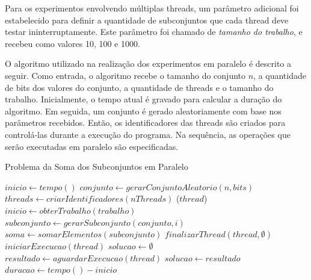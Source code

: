 \documentclass[12pt]{article}
\begin{document}
Para os experimentos envolvendo múltiplas threads, um parâmetro adicional foi estabelecido para definir a quantidade de subconjuntos que cada thread deve testar ininterruptamente. Este parâmetro foi chamado de \textit{tamanho do trabalho}, e recebeu como valores 10, 100 e 1000.

O algoritmo utilizado na realização dos experimentos em paralelo é descrito a seguir. Como entrada, o algoritmo recebe o tamanho do conjunto $n$, a quantidade de bits dos valores do conjunto, a quantidade de threads e o tamanho do trabalho. Inicialmente, o tempo atual é gravado para calcular a duração do algoritmo. Em seguida, um conjunto é gerado aleatoriamente com base nos parâmetros recebidos. Então, os identificadores das threads são criados para controlá-las durante a execução do programa. Na sequência, as operações que serão executadas em paralelo são especificadas.

\begin{algorithm}[ht]
  \small
  \DontPrintSemicolon
  \caption{Problema da Soma dos Subconjuntos em Paralelo}
  \label{alg:exp}

  \BlankLine
  $inicio \leftarrow tempo()$ \;
  $conjunto \leftarrow gerarConjuntoAleatorio(n, bits)$ \;
  $threads \leftarrow criarIdentificadores(nThreads)$ \;
  \BlankLine
   {
    \Parallel($thread$){
         {
            $inicio \leftarrow obterTrabalho(trabalho)$ \;
             {
                $subconjunto \leftarrow gerarSubconjunto(conjunto, i)$ \;
                $soma \leftarrow somarElementos(subconjunto)$ \;
                \BlankLine
            }
        }
        \BlankLine
        $finalizarThread(thread, \emptyset)$ \;
    }
    \BlankLine
    $iniciarExecucao(thread)$ \;
  }
  \BlankLine
  $solucao \leftarrow \emptyset$ \;
  \BlankLine
   {
    $resultado \leftarrow aguardarExecucao(thread)$ \;
     {
        $solucao \leftarrow resultado$ \;
    }
  }
  \BlankLine
  $duracao \leftarrow tempo() - inicio$ \;
   \;
\end{algorithm}
\end{document}
